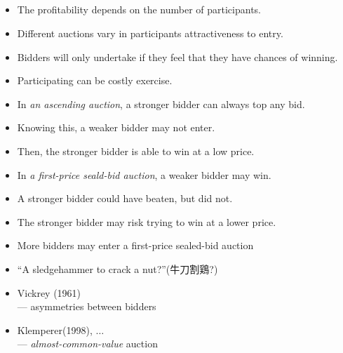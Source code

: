 \documentclass[uplatex,14pt,dvipdfmx,xcolor=svgnames]{beamer}
\begin{document}
\subsection{\ssecIIIa}
\begin{frame}[t]{\ssecIIIa}

\begin{itemize}
	\item The profitability depends on the number of participants.
	\item Different auctions vary in participants attractiveness to entry.
	\vspace{5mm}
	\item Bidders will only undertake if they feel that they have chances of winning.
	\item Participating can be costly exercise.
\end{itemize}

\end{frame}

\begin{frame}[t]{\ssecIIIa}

\begin{itemize}
	\item In \emph{an ascending auction}, a stronger bidder can always top any bid.
	\item Knowing this, a weaker bidder may not enter.
	\item Then, the stronger bidder is able to win at a low price.
	\vspace{3mm}
	\item In \emph{a first-price seald-bid auction}, a weaker bidder may win.
	\item A stronger bidder could have beaten, but did not.
	\item The stronger bidder may risk trying to win at a lower price.
	\vspace{3mm}
	\item More bidders may enter a first-price sealed-bid auction
\end{itemize}

\end{frame}


\begin{frame}[t]{\ssecIIIa}

\begin{itemize}
	\item ``A sledgehammer to crack a nut?''(牛刀割鶏?) 
	\item Vickrey (1961) \\
		--- asymmetries between bidders
	\item Klemperer(1998), $\ldots$ \\
		--- \textsl{almost-common-value} auction
\end{itemize}	
	
\end{frame}
\end{document}
